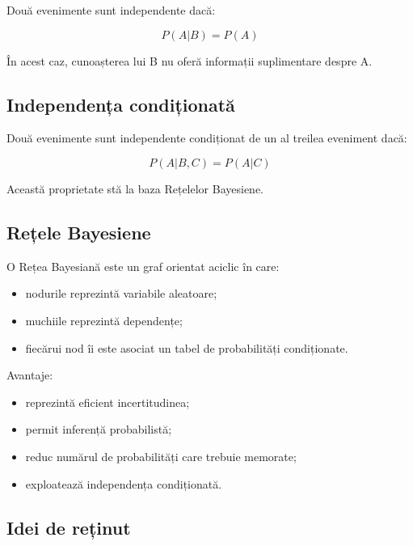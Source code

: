 \documentclass[12pt,a4paper]{article}
\begin{document}
Două evenimente sunt independente dacă:

\[
P(A|B)
=
P(A)
\]

În acest caz, cunoașterea lui B nu oferă informații suplimentare despre A.

\subsection{Independența condiționată}

Două evenimente sunt independente condiționat de un al treilea eveniment dacă:

\[
P(A|B,C)
=
P(A|C)
\]

Această proprietate stă la baza Rețelelor Bayesiene.

\subsection{Rețele Bayesiene}

O Rețea Bayesiană este un graf orientat aciclic în care:

\begin{itemize}
\item nodurile reprezintă variabile aleatoare;
\item muchiile reprezintă dependențe;
\item fiecărui nod îi este asociat un tabel de probabilități condiționate.
\end{itemize}

Avantaje:

\begin{itemize}
\item reprezintă eficient incertitudinea;
\item permit inferență probabilistă;
\item reduc numărul de probabilități care trebuie memorate;
\item exploatează independența condiționată.
\end{itemize}

\subsection{Idei de reținut}
\end{document}
